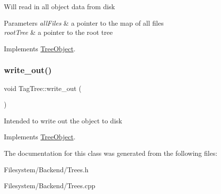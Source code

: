 Will read in all object data from disk 
\begin{DoxyParams}{Parameters}
{\em all\+Files} & a pointer to the map of all files \\
\hline
{\em root\+Tree} & a pointer to the root tree \\
\hline
\end{DoxyParams}


Implements \mbox{\hyperlink{classTreeObject_a722eb00e6782626281afc8eff92840a4}{Tree\+Object}}.

\mbox{\label{classTagTree_adf13e01b25991ecfef1ad958e02c07fe}} 
\subsubsection{\texorpdfstring{write\+\_\+out()}{write\_out()}}
{\footnotesize\ttfamily void Tag\+Tree\+::write\+\_\+out (\begin{DoxyParamCaption}{ }\end{DoxyParamCaption})\hspace{0.3cm}{\ttfamily [virtual]}}

Intended to write out the object to disk 

Implements \mbox{\hyperlink{classTreeObject_a63708d61353d83e3e03597394bb7aca0}{Tree\+Object}}.



The documentation for this class was generated from the following files\+:\begin{DoxyCompactItemize}
\item 
Filesystem/\+Backend/Trees.\+h\item 
Filesystem/\+Backend/Trees.\+cpp\end{DoxyCompactItemize}
